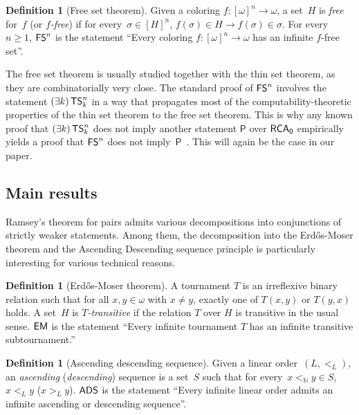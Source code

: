 \documentclass{amsart}
\theoremstyle{definition}
\newtheorem{definition}[theorem]{Definition}
\theoremstyle{remark}
\numberwithin{equation}{section}
\theoremstyle{noparens}
\newcommand{\imp}{\rightarrow}
\newcommand{\Nb}{\mathbb{N}}
\newcommand{\Psf}{\mathsf{P}}
\newcommand{\s}[1]{\ensuremath{\sf{#1}}}
\DeclareMathOperator{\rca}{\s{RCA}_0}
\DeclareMathOperator{\ads}{\s{ADS}}
\DeclareMathOperator{\ts}{\s{TS}}
\DeclareMathOperator{\fs}{\s{FS}}
\DeclareMathOperator{\emo}{\s{EM}}
\begin{document}
\begin{definition}[Free set theorem]
Given a coloring $f : [\omega]^n \to \omega$, a set~$H$
is \emph{free} for~$f$ (or \emph{$f$-free}) if for every~$\sigma \in [H]^n$,
$f(\sigma) \in H \imp f(\sigma) \in \sigma$.
For every~$n \geq 1$, $\fs^n$ is the statement
``Every coloring $f : [\omega]^n \to \omega$ has an infinite $f$-free set''.
\end{definition}

The free set theorem is usually studied together with the thin set theorem,
as they are combinatorially very close. The standard proof of $\fs^n$ involves
the statement $(\exists k)\ts^n_k$ in a way that propagates most of the computability-theoretic properties of
the thin set theorem to the free set theorem. This is why any known proof that $(\exists k)\ts^n_k$
does not imply another statement $\Psf$ over $\rca$ empirically yields a proof that $\fs^n$
does not imply~$\Psf$~\cite{Cholak2001Free,Wang2014Some,Patey2016weakness,PateyCombinatorial}.
This will again be the case in our paper.

\subsection{Main results}
Ramsey's theorem for pairs
admits various decompositions into conjunctions of strictly weaker
 statements. Among
them, the decomposition into the Erd\H{o}s-Moser theorem and the Ascending Descending sequence principle
is particularly interesting for various technical reasons.

\begin{definition}[Erd\H{o}s-Moser theorem]
A tournament $T$ is an irreflexive binary relation such that for all $x,y \in \omega$ with $x \not= y$, exactly one of $T(x,y)$ or $T(y,x)$ holds. A set~$H$ is \emph{$T$-transitive} if the relation $T$ over $H$ is transitive in the usual sense.
$\emo$ is the statement ``Every infinite tournament $T$ has an infinite transitive subtournament.''
\end{definition}

\begin{definition}[Ascending descending sequence]
Given a linear order~$(L, <_L)$, an \emph{ascending} (\emph{descending}) sequence
is a set~$S$ such that for every~$x <_\Nb y \in S$, $x <_L y$ ($x >_L y$).
$\ads$ is the statement ``Every infinite linear order admits an infinite ascending or descending sequence''.
\end{definition}
\end{document}
